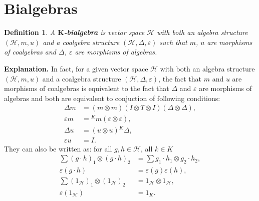 \documentclass[a4paper, 12pt]{report}
\newtheorem{definition}{Definition}
\begin{document}
\section{Bialgebras}
\begin{definition}
A \textbf{$\textbf{K}$-bialgebra} is vector space $\mathcal{H}$ with both an algebra structure
$(\mathcal{H}, m, u)$ and a coalgebra structure $(\mathcal{H}, \Delta, \varepsilon)$ such that $m$, $u$
are morphisms of coalgebras and $\Delta$, $\varepsilon$ are morphisms of algebras.
\end{definition}
\textbf{Explanation. } In fact, for a given vector space $\mathcal{H}$ with both an algebra structure
$(\mathcal{H}, m, u)$ and a coalgebra structure $(\mathcal{H}, \Delta, \varepsilon)$, the fact that
$m$ and $u$ are morphisms of coalgebras is equivalent to the fact that $\Delta$ and $\varepsilon$ are
morphisms of
algebras and both are equivalent to conjuction of following conditions:
\begin{align*}
\Delta m &= (m\otimes m)(I \otimes T \otimes I)(\Delta \otimes \Delta), \\
\varepsilon m &= {^Km}(\varepsilon \otimes \varepsilon), \\
\Delta u &= (u \otimes u){^K\Delta}, \\
\varepsilon u &= I.
\end{align*}
They can also be written as: for all $g, h \in \mathcal{H}$, all $k \in K$
\begin{align*}
\sum (g \cdot h)_1 \otimes (g \cdot h)_2 &= \sum g_1 \cdot h_1 \otimes g_2 \cdot h_2, \\
\varepsilon(g \cdot h) &= \varepsilon(g)\varepsilon(h), \\
\sum (1_\mathcal{H})_1 \otimes (1_\mathcal{H})_2 &= 1_\mathcal{H} \otimes 1_\mathcal{H}, \\
\varepsilon (1_\mathcal{H}) &= 1_K.
\end{align*}
\end{document}
